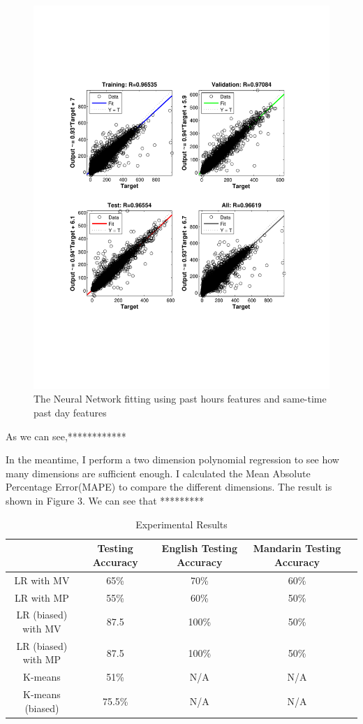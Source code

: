 \documentclass{sig-alternate}
\begin{document}
\begin{figure}
\centering
\includegraphics[scale = 0.4]{pic/reg1.pdf}
\caption{The Neural Network fitting using past hours features and same-time past day features}
\end{figure}


As we can see,************


In the meantime, I perform a two dimension polynomial regression to see how many dimensions are sufficient enough. I calculated the Mean Absolute Percentage Error(MAPE) to compare the different dimensions. The result is shown in Figure 3. We can see that *********







\begin{table}[ht]
\centering
\caption{Experimental Results}
\begin{tabular}{|c|c|c|c|c|} \hline
&Testing Accuracy&English Testing Accuracy&Mandarin Testing Accuracy \\ \hline
LR with MV & 65\% & 70\%  & 60\% \\ \hline
LR with MP & 55\% & 60\%  & 50\% \\ \hline
LR (biased) with MV&87.5 & 100\% & 50\%\\ \hline
LR (biased) with MP&87.5 & 100\% & 50\%\\ \hline
K-means & 51\% & N/A&N/A \\ \hline
K-means (biased)& 75.5\% & N/A&N/A \\ \hline
\end{tabular}
\end{table}
\end{document}

